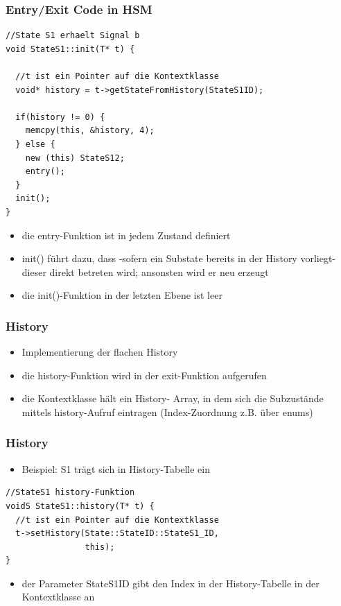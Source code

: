 \documentclass{beamer}
\begin{document}
\begin{frame}[fragile]
 \frametitle{Entry/Exit Code in HSM }
 \begin{lstlisting}
//State S1 erhaelt Signal b
void StateS1::init(T* t) {

  //t ist ein Pointer auf die Kontextklasse
  void* history = t->getStateFromHistory(StateS1ID);

  if(history != 0) {
    memcpy(this, &history, 4);
  } else {
    new (this) StateS12;
    entry();
  }
  init();
}
 \end{lstlisting}
\end{frame}

\begin{frame}[fragile]
 \begin{itemize}
  \item die entry-Funktion ist in jedem Zustand definiert
  \item init() f\"uhrt dazu, dass -sofern ein Substate bereits in der History vorliegt- dieser direkt betreten wird; ansonsten wird er neu erzeugt
  \item die init()-Funktion in der letzten Ebene ist leer
 \end{itemize}
\end{frame}

\begin{frame}
 \frametitle{History}
 \begin{itemize}
  \item Implementierung der flachen History
  \item die history-Funktion  wird in der exit-Funktion aufgerufen
  \item die Kontextklasse h\"alt ein History- Array,
  in dem sich die Subzust\"ande mittels history-Aufruf eintragen (Index-Zuordnung z.B. \"uber enums)
 \end{itemize}
\end{frame}

\begin{frame}[fragile]
 \frametitle{History}
 \begin{itemize}
  \item Beispiel: S1 tr\"agt sich in History-Tabelle ein
 \end{itemize}
 \begin{lstlisting}
//StateS1 history-Funktion
voidS StateS1::history(T* t) {
  //t ist ein Pointer auf die Kontextklasse
  t->setHistory(State::StateID::StateS1_ID,
                this);
}
 \end{lstlisting}
 \begin{itemize}
  \item der Parameter StateS1ID gibt den Index in der History-Tabelle in der Kontextklasse an
 \end{itemize}
\end{frame}
\end{document}

